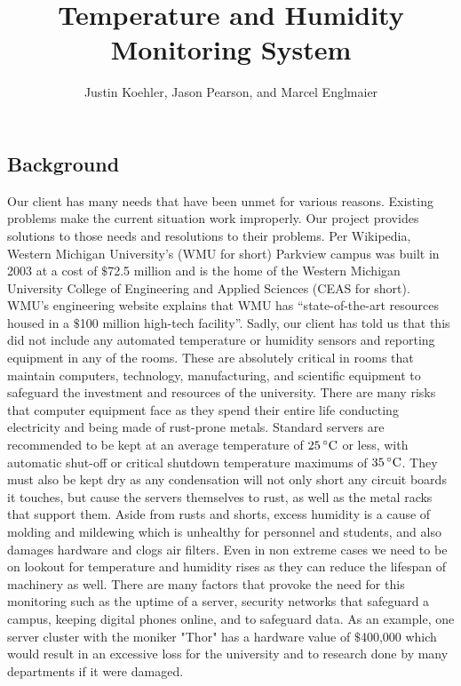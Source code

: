\documentclass{report}
\begin{document}
\title{Temperature and Humidity Monitoring System}
\author{Justin Koehler, Jason Pearson, and Marcel Englmaier}
\maketitle
\tableofcontents
\newpage

\subsection*{Background}
\indent
\indent
Our client has many needs that have been unmet for various reasons. Existing problems make the current situation work improperly. Our project provides solutions to those needs and resolutions to their problems.
\newline
\indent
Per Wikipedia, Western Michigan University's (WMU for short) Parkview campus was built in 2003 at a cost of $\$$72.5 million and is the home of the Western Michigan University College of Engineering and Applied Sciences (CEAS for short). WMU’s engineering website explains that WMU has “state-of-the-art resources housed in a $\$$100 million high-tech facility”. Sadly, our client has told us that this did not include any automated temperature or humidity sensors and reporting equipment in any of the rooms. 
These are absolutely critical in rooms that maintain computers, technology, manufacturing, and scientific equipment to safeguard the investment and resources of the university.  There are many risks that computer equipment face as they spend their entire life conducting electricity and being made of rust-prone metals. Standard servers are recommended to be kept at an average temperature of $25\,^{\circ}{\rm C}$ or less, with automatic shut-off or critical shutdown temperature maximums of $35\,^{\circ}{\rm C}$. They must also be kept dry as any condensation will not only short any circuit boards it touches, but cause the servers themselves to rust, as well as the metal racks that support them. Aside from rusts and shorts, excess humidity is a cause of molding and mildewing which is unhealthy for personnel and students, and also damages hardware and clogs air filters. Even in non extreme cases we need to be on lookout for temperature and humidity rises as they can reduce the lifespan of machinery as well.
\newline
\indent
There are many factors that provoke the need for this monitoring such as the uptime of a server, security networks that safeguard a campus, keeping digital phones online, and to safeguard data. As an example, one server cluster with the moniker "Thor" has a hardware value of $\$$400,000 which would result in an excessive loss for the university and to research done by many departments if it were damaged.
\end{document}
